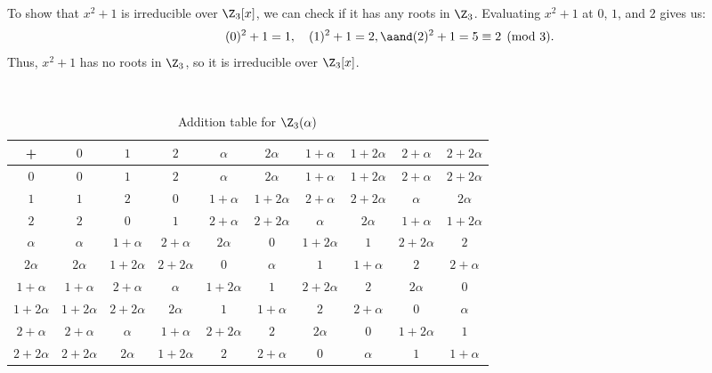 \begin{solution}[(i)]
  To show that $x^2 + 1$ is irreducible over $\Z_3[x]$, we can check if it has any roots in $\Z_3$. Evaluating $x^2 + 1$ at $0$, $1$, and $2$ gives us:
  \[%
    (0)^2 + 1 = 1, \quad (1)^2 + 1 = 2, \aand (2)^2 + 1 = 5 \equiv 2 \pmod{3}
  .\]%
  Thus, $x^2 + 1$ has no roots in $\Z_3$, so it is irreducible over $\Z_3[x]$.
\end{solution}

\begin{solution}[(ii)] $ $

  \begin{table}[H]
    \begin{center}
      \begin{tabular}{c||ccccccccc}
        + & $0$ & $1$ & $2$ & $\alpha$ & $2\alpha$ & $1+\alpha$ & $1+2\alpha$ & $2+\alpha$ & $2+2\alpha$\\
        \hline\hline
        $0$ & $0$ & $1$ & $2$ & $\alpha$ & $2\alpha$ & $1+\alpha$ & $1+2\alpha$ & $2+\alpha$ & $2+2\alpha$ \\
        \hline
        $1$ & $1$ & $2$ & $0$ & $1+\alpha$ & $1+2\alpha$ & $2+\alpha$ & $2+2\alpha$ & $\alpha$ & $2\alpha$ \\
        \hline
        $2$ & $2$ & $0$ & $1$ & $2+\alpha$ & $2+2\alpha$ & $\alpha$ & $2\alpha$ & $1+\alpha$ & $1+2\alpha$ \\
        \hline
        $\alpha$ & $\alpha$ & $1+\alpha$ & $2+\alpha$ & $2\alpha$ & $0$ & $1+2\alpha$ & $1$ & $2+2\alpha$ & $2$ \\
        \hline
        $2\alpha$ & $2\alpha$ & $1+2\alpha$ & $2+2\alpha$ & $0$ & $\alpha$ & $1$ & $1+\alpha$ & $2$ & $2+\alpha$ \\  
        \hline 
        $1+\alpha$ & $1+\alpha$ & $2+\alpha$ & $\alpha$ & $1+2\alpha$ & $1$ & $2+2\alpha$ & $2$ & $2\alpha$ & $0$ \\ 
        \hline 
        $1+2\alpha$ & $1+2\alpha$ & $2+2\alpha$ & $2\alpha$ & $1$ & $1+\alpha$ & $2$ & $2+\alpha$ & $0$ & $\alpha$ \\  
        \hline 
        $2+\alpha$ & $2+\alpha$ & $\alpha$ & $1+\alpha$ & $2+2\alpha$ & $2$ & $2\alpha$ & $0$ & $1+2\alpha$ & $1$ \\ 
        \hline
        $2+2\alpha$ & $2+2\alpha$ & $2\alpha$ & $1+2\alpha$ & $2$ & $2+\alpha$ & $0$ & $\alpha$ & $1$ & $1+\alpha$ 
      \end{tabular}
      \caption{Addition table for $\Z_3(\alpha)$}
    \end{center}
  \end{table}


\end{solution}
